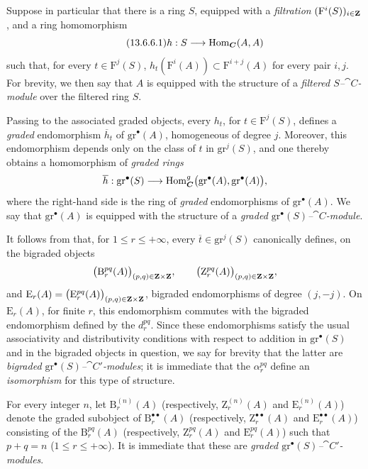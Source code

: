 \begin{env}[13.6.6]
\label{0.13.6.6}
Suppose in particular that there is a ring $S$, equipped with a
\emph{filtration} $(\mathrm{F}^i(S))_{i\in\mathbf{Z}}$, and a ring
homomorphism
\begin{equation}
\label{0.13.6.6.1}
\tag{13.6.6.1}
  h:S\longrightarrow\operatorname{Hom}_{\boldsymbol{C}}(A,A)
\end{equation}
such that, for every $t\in\mathrm{F}^j(S)$, $h_t(\mathrm{F}^i(A))
\subset
\mathrm{F}^{i+j}(A)$
for every pair $i,j$.
For brevity, we then say that $A$ is equipped with the structure of a
\emph{filtered $S$--$\cat{C}$-module} over the filtered ring $S$.

Passing to the associated graded objects, every $h_t$, for
$t\in\mathrm{F}^j(S)$, defines a \emph{graded} endomorphism
$\overline{h}_t$ of $\mathrm{gr}^\bullet(A)$, homogeneous of degree
$j$.
Moreover, this endomorphism depends only on the class of $t$ in
$\mathrm{gr}^j(S)$, and one thereby obtains a homomorphism of
\emph{graded rings}
\[
  \overline{h}:
  \mathrm{gr}^\bullet(S)
  \longrightarrow
  \operatorname{Hom}_{\boldsymbol{C}}^g
  \bigl(\mathrm{gr}^\bullet(A),\mathrm{gr}^\bullet(A)\bigr),
\]
where the right-hand side is the ring of \emph{graded} endomorphisms of
$\mathrm{gr}^\bullet(A)$.
We say that $\mathrm{gr}^\bullet(A)$ is equipped with the structure
of a \emph{graded $\mathrm{gr}^\bullet(S)$--$\cat{C}$-module}.

It follows from  that, for
$1\leq r\leq+\infty$, every
$\overline{t}\in\mathrm{gr}^j(S)$ canonically defines, on the
bigraded objects
\[
  \bigl(\mathrm{B}_r^{pq}(A)\bigr)_{(p,q)\in\mathbf{Z}\times\mathbf{Z}},
  \qquad
  \bigl(\mathrm{Z}_r^{pq}(A)\bigr)_{(p,q)\in\mathbf{Z}\times\mathbf{Z}},
\]
and $\mathrm{E}_r(A)
=
\bigl(\mathrm{E}_r^{pq}(A)\bigr)_{(p,q)\in\mathbf{Z}\times\mathbf{Z}}$,
bigraded endomorphisms of degree $(j,-j)$.
On $\mathrm{E}_r(A)$, for finite $r$, this endomorphism commutes with
the bigraded endomorphism defined by the $d_r^{pq}$.
Since these endomorphisms satisfy the usual associativity and
distributivity conditions with respect to addition in
$\mathrm{gr}^\bullet(S)$ and in the bigraded objects in question,
we say for brevity that the latter are
\emph{bigraded $\mathrm{gr}^\bullet(S)$--$\cat{C}'$-modules};
it is immediate that the $\alpha_r^{pq}$ define an \emph{isomorphism} for
this type of structure.

For every integer $n$, let $\mathrm{B}_r^{(n)}(A)$
(respectively, $\mathrm{Z}_r^{(n)}(A)$ and
$\mathrm{E}_r^{(n)}(A)$) denote the graded subobject of
$\mathrm{B}_r^{\bullet\bullet}(A)$
(respectively, $\mathrm{Z}_r^{\bullet\bullet}(A)$ and
$\mathrm{E}_r^{\bullet\bullet}(A)$) consisting of the $\mathrm{B}_r^{pq}(A)$
(respectively, $\mathrm{Z}_r^{pq}(A)$ and $\mathrm{E}_r^{pq}(A)$) such
that $p+q=n$ ($1\leq r\leq+\infty$).
It is immediate that these are
\emph{graded $\mathrm{gr}^\bullet(S)$--$\cat{C}'$-modules}.


\end{env}

